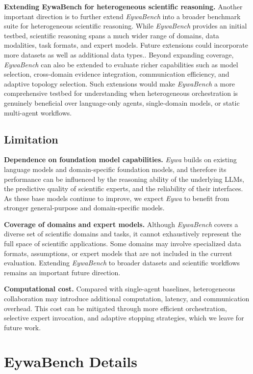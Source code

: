 \documentclass{llmxive}
\begin{document}
{\textbf{Extending EywaBench for heterogeneous scientific reasoning.}
Another important direction is to further extend \textit{EywaBench} into a broader benchmark suite for heterogeneous scientific reasoning. While \textit{EywaBench} provides an initial testbed, scientific reasoning spans a much wider range of domains, data modalities, task formats, and expert models. Future extensions could incorporate more datasets as well as additional data types.. Beyond expanding coverage, \textit{EywaBench} can also be extended to evaluate richer capabilities such as model selection, cross-domain evidence integration, communication efficiency, and adaptive topology selection. Such extensions would make \textit{EywaBench} a more comprehensive testbed for understanding when heterogeneous orchestration is genuinely beneficial over language-only agents, single-domain models, or static multi-agent workflows.


\subsection{Limitation}

\textbf{Dependence on foundation model capabilities.}
\textit{Eywa} builds on existing language models and domain-specific foundation models, and therefore its performance can be influenced by the reasoning ability of the underlying LLMs, the predictive quality of scientific experts, and the reliability of their interfaces. As these base models continue to improve, we expect \textit{Eywa} to benefit from stronger general-purpose and domain-specific models.

\textbf{Coverage of domains and expert models.}
Although \textit{EywaBench} covers a diverse set of scientific domains and tasks, it cannot exhaustively represent the full space of scientific applications. Some domains may involve specialized data formats, assumptions, or expert models that are not included in the current evaluation. Extending \textit{EywaBench} to broader datasets and scientific workflows remains an important future direction.

\textbf{Computational cost.}
Compared with single-agent baselines, heterogeneous collaboration may introduce additional computation, latency, and communication overhead. This cost can be mitigated through more efficient orchestration, selective expert invocation, and adaptive stopping strategies, which we leave for future work.




\section{EywaBench Details}
\label{sec:dataset_details}


}
\end{document}
